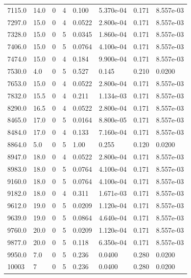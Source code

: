 \documentclass[preview]{standalone}
\begin{document}
{{{\begin{tabular}{L{1.2cm}C{1.2cm} C{0.3cm}C{0.5cm} C{1.4cm}C{1.4cm} C{1.4cm}C{1.4cm}}
  7115.0  &  14.0  & 0     &  4 &  0.100  & 5.370e-04  & 0.171 &  8.557e-03   \\ 
  7297.0  &  15.0  & 0     &  4 &  0.0522  & 2.800e-04  & 0.171 &  8.557e-03   \\ 
  7328.0  &  15.0  & 0     &  5 &  0.0345  & 1.860e-04  & 0.171 &  8.557e-03   \\ 
  7406.0  &  15.0  & 0     &  5 &  0.0764  & 4.100e-04  & 0.171 &  8.557e-03   \\ 
  7474.0  &  15.0  & 0     &  4 &  0.184  & 9.900e-04  & 0.171 &  8.557e-03   \\ 
  7530.0  &   4.0  & 0     &  5 &  0.527  & 0.145  & 0.210 &  0.0200   \\ 
  7653.0  &  15.0  & 0     &  4 &  0.0522  & 2.800e-04  & 0.171 &  8.557e-03   \\ 
  7832.0  &  15.5  & 0     &  4 &  0.211  & 1.134e-03  & 0.171 &  8.557e-03   \\ 
  8290.0  &  16.5  & 0     &  4 &  0.0522  & 2.800e-04  & 0.171 &  8.557e-03   \\ 
  8465.0  &  17.0  & 0     &  5 &  0.0164  & 8.800e-05  & 0.171 &  8.557e-03   \\ 
  8484.0  &  17.0  & 0     &  4 &  0.133  & 7.160e-04  & 0.171 &  8.557e-03   \\ 
  8864.0  &   5.0  & 0     &  5 &  1.00  & 0.255  & 0.120 &  0.0200   \\ 
  8947.0  &  18.0  & 0     &  4 &  0.0522  & 2.800e-04  & 0.171 &  8.557e-03   \\ 
  8983.0  &  18.0  & 0     &  5 &  0.0764  & 4.100e-04  & 0.171 &  8.557e-03   \\ 
  9160.0  &  18.0  & 0     &  5 &  0.0764  & 4.100e-04  & 0.171 &  8.557e-03   \\ 
  9182.0  &  18.0  & 0     &  4 &  0.311  & 1.671e-03  & 0.171 &  8.557e-03   \\ 
  9612.0  &  19.0  & 0     &  5 &  0.0209  & 1.120e-04  & 0.171 &  8.557e-03   \\ 
  9639.0  &  19.0  & 0     &  5 &  0.0864  & 4.640e-04  & 0.171 &  8.557e-03   \\ 
  9760.0  &  20.0  & 0     &  5 &  0.0209  & 1.120e-04  & 0.171 &  8.557e-03   \\ 
  9877.0  &  20.0  & 0     &  5 &  0.118  & 6.350e-04  & 0.171 &  8.557e-03   \\ 
  9950.0  &   7.0  & 0     &  5 &  0.236  & 0.0400  & 0.280 &  0.0200   \\ 
  10003  &     7  & 0     &  5 &  0.236  & 0.0400  & 0.280 &  0.0200   \\ 

\end{tabular}}}}
\end{document}

